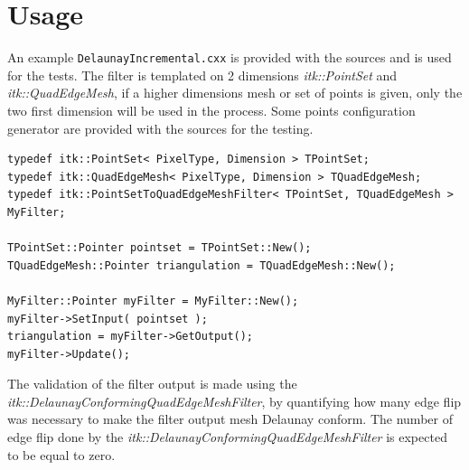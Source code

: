\documentclass{InsightArticle}
\begin{document}
\begin{figure}
\label{fig:Algo}
\end{figure}

\section{Usage}

An example \texttt{DelaunayIncremental.cxx} is provided with the sources and is used for the tests. The filter is templated on 2 dimensions \textit{itk::PointSet} and \textit{itk::QuadEdgeMesh}, if a higher dimensions mesh or set of points is given, only the two first dimension will be used in the process. Some points configuration generator are provided with the sources for the testing.

\begin{verbatim}
typedef itk::PointSet< PixelType, Dimension > TPointSet;
typedef itk::QuadEdgeMesh< PixelType, Dimension > TQuadEdgeMesh;
typedef itk::PointSetToQuadEdgeMeshFilter< TPointSet, TQuadEdgeMesh > MyFilter;

TPointSet::Pointer pointset = TPointSet::New();
TQuadEdgeMesh::Pointer triangulation = TQuadEdgeMesh::New();

MyFilter::Pointer myFilter = MyFilter::New();
myFilter->SetInput( pointset );
triangulation = myFilter->GetOutput();
myFilter->Update();
\end{verbatim}

The validation of the filter output is made using the \emph{itk::DelaunayConformingQuadEdgeMeshFilter}, by quantifying how many edge flip was necessary to make the filter output mesh Delaunay conform. The number of edge flip done by the \emph{itk::DelaunayConformingQuadEdgeMeshFilter} is expected to be equal to zero.
\end{document}
